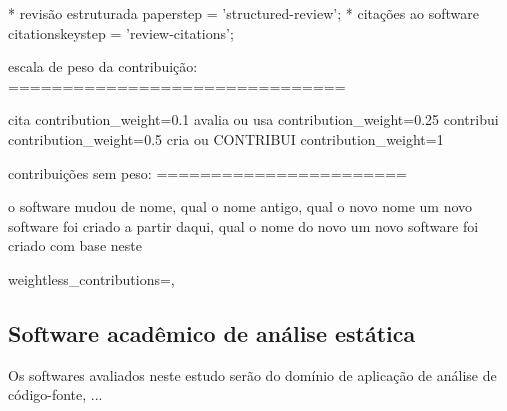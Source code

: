 * revisão estruturada
   paper{step} = 'structured-review';
* citações ao software
   citations{key}{step} = 'review-citations';

escala de peso da contribuição:
===============================

cita
  contribution\_weight=0.1
avalia ou usa
  contribution\_weight=0.25
contribui
  contribution\_weight=0.5
cria ou CONTRIBUI
  contribution\_weight=1

contribuições sem peso:
=======================

o software mudou de nome, qual o nome antigo, qual o novo nome
um novo software foi criado a partir daqui, qual o nome do novo
um novo software foi criado com base neste

  weightless\_contributions={},


%
%
%


%
%
%
%
%
%

%
%
%
%

\subsection{Software acadêmico de análise estática}

Os softwares avaliados neste estudo serão do domínio de aplicação de análise de
código-fonte, ...

